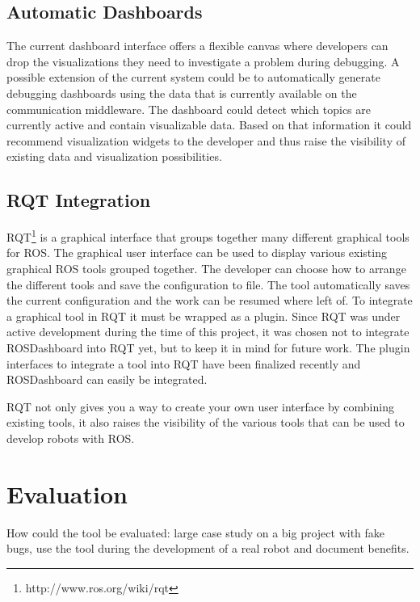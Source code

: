 \subsection{Automatic Dashboards}
The current dashboard interface offers a flexible canvas where developers can drop the visualizations they need to investigate a problem during debugging. A possible extension of the current system could be to automatically generate debugging dashboards using the data that is currently available on the communication middleware. The dashboard could detect which topics are currently active and contain visualizable data. Based on that information it could recommend visualization widgets to the developer and thus raise the visibility of existing data and visualization possibilities.

\subsection{RQT Integration}

RQT\footnote{http://www.ros.org/wiki/rqt} is a graphical interface that groups together many different graphical tools for ROS. The graphical user interface can be used to display various existing graphical ROS tools grouped together. The developer can choose how to arrange the different tools and save the configuration to file. The tool automatically saves the current configuration and the work can be resumed where left of. To integrate a graphical tool in RQT it must be wrapped as a plugin.
Since RQT was under active development during the time of this project, it was chosen not to integrate ROSDashboard into RQT yet, but to keep it in mind for future work. The plugin interfaces to integrate a tool into RQT have been finalized recently and ROSDashboard can easily be integrated.

RQT not only gives you a way to create your own user interface by combining existing tools, it also raises the visibility of the various tools that can be used to develop robots with ROS.

\section{Evaluation}

How could the tool be evaluated: large case study on a big project with fake bugs, use the tool during the development of a real robot and document benefits.

